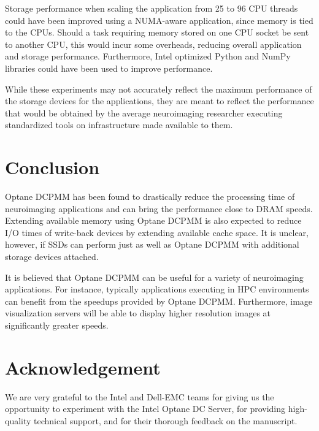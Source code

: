 \documentclass[conference]{IEEEtran}
\begin{document}
Storage performance when scaling the application from 25 to 96 CPU threads could have been improved using a
NUMA-aware application, since memory is tied to the CPUs. Should a task requiring memory
stored on one CPU socket be sent to another CPU, this would incur some overheads, reducing overall application
and storage performance. Furthermore, Intel optimized Python and NumPy libraries could have been used to improve 
performance.

While these experiments may not accurately reflect the maximum performance of the storage devices for the applications,
they are meant to reflect the performance that would be obtained by the average neuroimaging researcher
executing standardized tools on infrastructure made available to them.

\section{Conclusion}

Optane DCPMM has been found to drastically reduce the processing time of neuroimaging applications and
can bring the performance close to DRAM speeds. Extending available memory using Optane DCPMM is also 
expected to reduce I/O times of write-back devices by extending available cache space.
It is unclear, however, if SSDs can perform just as well as Optane DCPMM with additional storage devices
attached.

It is believed that Optane DCPMM can be useful for a variety of neuroimaging applications. For
instance, typically applications executing in HPC environments can benefit from 
the speedups provided by Optane DCPMM. Furthermore, image visualization servers will be able
to display higher resolution images at significantly greater speeds.
\section{Acknowledgement}
We are very grateful to the Intel and Dell-EMC teams for giving us the
opportunity to experiment with the Intel Optane DC Server, for providing
high-quality technical support, and for their thorough feedback on the
manuscript. 
 

\end{document}
